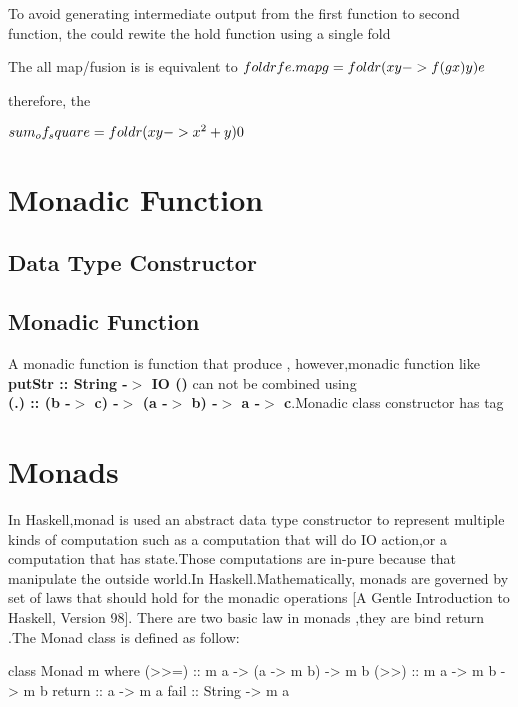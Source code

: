 
To avoid generating intermediate output from the first function to second function, the could rewite the hold function using a single fold

The all map/fusion is is equivalent to 
$ foldr f e . map g = foldr (\\x y -> f (g x) y) e $

therefore, the 

$ sum_of_square = foldr (\\x y -> x^2 + y) 0 $





\section{Monadic Function}
\subsection{Data Type Constructor}

\subsection{Monadic Function}
A monadic function is function that produce , however,monadic function like \textbf{putStr :: String -$>$ IO ()} can not be combined using \\ \textbf{(.) :: (b -$>$ c) -$>$ (a -$>$ b) -$>$ a -$>$ c}.Monadic class constructor has tag 



\section{Monads}
In Haskell,monad is used an abstract data type constructor to represent multiple kinds of computation such as a computation that will do IO action,or a computation that has state.Those computations are in-pure because that manipulate the outside world.In Haskell.Mathematically, monads are governed by set of laws that should hold for the monadic operations [A Gentle Introduction to Haskell, Version 98]. There are two basic law in monads ,they are bind return .The Monad class is defined as follow:
\begin{hcode}
class Monad m where
  (>>=) :: m a -> (a -> m b) -> m b
  (>>) :: m a -> m b -> m b
  return :: a -> m a
  fail :: String -> m a
\end{hcode}

